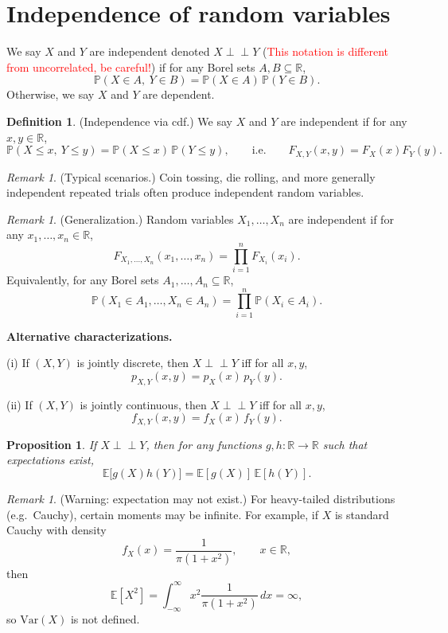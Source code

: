 \documentclass[11pt]{article}
\theoremstyle{plain}
\newtheorem{proposition}[theorem]{Proposition}
\theoremstyle{definition}
\newtheorem{definition}[theorem]{Definition}
\theoremstyle{remark}
\newtheorem{remark}[theorem]{Remark}
\begin{document}
	
	
	\section{Independence of random variables}
	We say \(X\) and \(Y\) are independent denoted \(X\perp\!\!\!\perp Y\) (\textcolor{red}{This notation is different from uncorrelated, be careful!}) if for any Borel sets \(A,B\subseteq\mathbb{R}\),
	\[
	\mathbb{P}(X\in A,\ Y\in B)=\mathbb{P}(X\in A)\,\mathbb{P}(Y\in B).
	\]
	Otherwise, we say \(X\) and \(Y\) are dependent.
	
	
	\begin{definition}
		(Independence via cdf.)
		We say \(X\) and \(Y\) are independent if for any \(x,y\in\mathbb{R}\),
		\[
		\mathbb{P}(X\le x,\ Y\le y)=\mathbb{P}(X\le x)\,\mathbb{P}(Y\le y),
		\qquad\text{i.e.}\qquad
		F_{X,Y}(x,y)=F_X(x)F_Y(y).
		\]
	\end{definition}
	
	\begin{remark}
		(Typical scenarios.) Coin tossing, die rolling, and more generally independent repeated trials
		often produce independent random variables.
	\end{remark}
	
	\begin{remark}
		(Generalization.)
		Random variables \(X_1,\dots,X_n\) are independent if for any \(x_1,\dots,x_n\in\mathbb{R}\),
		\[
		F_{X_1,\dots,X_n}(x_1,\dots,x_n)=\prod_{i=1}^{n} F_{X_i}(x_i).
		\]
		Equivalently, for any Borel sets \(A_1,\dots,A_n\subseteq\mathbb{R}\),
		\[
		\mathbb{P}(X_1\in A_1,\dots, X_n\in A_n)=\prod_{i=1}^{n}\mathbb{P}(X_i\in A_i).
		\]
	\end{remark}
	
	\textbf{Alternative characterizations.}
	
	(i) If \((X,Y)\) is jointly discrete, then \(X\perp\!\!\!\perp Y\) iff for all \(x,y\),
	\[
	p_{X,Y}(x,y)=p_X(x)\,p_Y(y).
	\]
	
	(ii) If \((X,Y)\) is jointly continuous, then \(X\perp\!\!\!\perp Y\) iff for all \(x,y\),
	\[
	f_{X,Y}(x,y)=f_X(x)\,f_Y(y).
	\]
	
	\begin{proposition}
		If \(X\perp\!\!\!\perp Y\), then for any functions \(g,h:\mathbb{R}\to\mathbb{R}\) such that expectations exist,
		\[
		\mathbb{E}\big[g(X)h(Y)\big]=\mathbb{E}[g(X)]\,\mathbb{E}[h(Y)].
		\]
	\end{proposition}
	
	\begin{remark}
		(Warning: expectation may not exist.)
		For heavy-tailed distributions (e.g.\ Cauchy), certain moments may be infinite.
		For example, if \(X\) is standard Cauchy with density
		\[
		f_X(x)=\frac{1}{\pi(1+x^2)},\qquad x\in\mathbb{R},
		\]
		then
		\[
		\mathbb{E}[X^2]=\int_{-\infty}^{\infty} x^2 \frac{1}{\pi(1+x^2)}\,dx=\infty,
		\]
		so \(\mathrm{Var}(X)\) is not defined.
	\end{remark}
	
\end{document}
